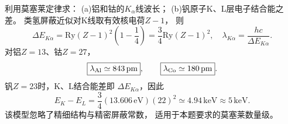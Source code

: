 利用莫塞莱定律求：
(a)铝和钴的$K_\alpha$线波长；
(b)钒原子K、L层电子结合能之差。
\exsolution
类氢屏蔽近似对K线取有效核电荷$Z-1$，
则
\[
 \Delta E_{K\alpha}=
 \mathrm{Ry}(Z-1)^2\left(1-\frac14\right)
 =\frac34\mathrm{Ry}(Z-1)^2,
 \quad \lambda_{K\alpha}=\frac{hc}{\Delta E_{K\alpha}}.
\]
对铝$Z=13$、钴$Z=27$，
\[
 \boxed{\lambda_{\rm Al}\simeq843\,\mathrm{pm}},\qquad
 \boxed{\lambda_{\rm Co}\simeq180\,\mathrm{pm}}.
\]
钒$Z=23$时，K、L结合能差即
$\Delta E_{K\alpha}$，因此
\[
 \boxed{E_K-E_L=
 \frac34(13.606\,\mathrm{eV})(22)^2
 \simeq4.94\,\mathrm{keV}\approx5\,\mathrm{keV}}.
\]
\excheck 该模型忽略了精细结构与精密屏蔽常数，
适用于本题要求的莫塞莱数量级。
